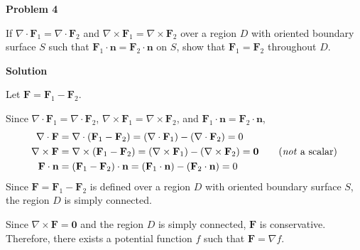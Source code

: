 \documentclass{article}
\newcommand{\lrp}[1]{\left( #1 \right)}
\newcommand{\F}[0]{\mathbf{F}}
\newcommand{\n}[0]{\mathbf{n}}
\begin{document}
\begin{mdframed}[backgroundcolor=gray!20]
\textbf{Problem 4}

If $\nabla \cdot \F_1=\nabla \cdot \F_2$ and $\nabla \times \F_1=\nabla \times \F_2$ over a region $D$ with oriented boundary surface $S$ such that $\F_1\cdot\n=\F_2\cdot\n$ on $S$, show that $\F_1=\F_2$ throughout $D$.
\end{mdframed}
\begin{mdframed}[backgroundcolor=white,linecolor=white]\textbf{Solution}

Let $\F=\F_1-\F_2$. 

Since $\nabla \cdot \F_1=\nabla \cdot \F_2$, $\nabla \times \F_1=\nabla \times \F_2$, and $\F_1\cdot \n = \F_2\cdot \n$,
\begin{align*}
    \nabla \cdot \F &=\nabla \cdot \lrp{\F_1 - \F_2}= \lrp{\nabla \cdot \F_1}-\lrp{\nabla \cdot \F_2}=0\\
    \nabla \times \F&=\nabla \times\lrp{\F_1-\F_2}=\lrp{\nabla \times \F_1}-\lrp{\nabla \times \F_2}=\mathbf{0}\tag{\textit{not} a scalar}\\
    \F\cdot \n &= \lrp{\F_1-\F_2}\cdot \n=\lrp{\F_1 \cdot \n}-\lrp{\F_2\cdot \n}=0
\end{align*}
Since $\mathbf{F}=\F_1-\F_2$ is defined over a region $D$ with oriented boundary surface $S$, the region $D$ is simply connected. 

Since $\nabla \times \F=\mathbf{0}$ and the region $D$ is simply connected, $\F$ is conservative. Therefore, there exists a potential function $f$ such that $\F=\nabla f$.


\end{mdframed}
\end{document}
